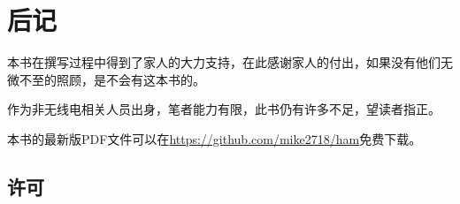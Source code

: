 \chapter*{后记}

本书在撰写过程中得到了家人的大力支持，在此感谢家人的付出，如果没有他们无微不至的照顾，是不会有这本书的。

作为非无线电相关人员出身，笔者能力有限，此书仍有许多不足，望读者指正。

本书的最新版PDF文件可以在\url{https://github.com/mike2718/ham}免费下载。

\section*{许可}


